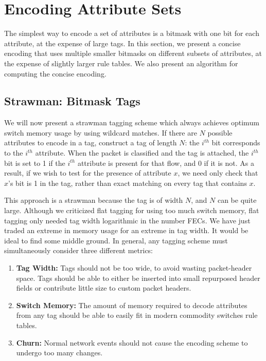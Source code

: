\section{Encoding Attribute Sets}
\label{sec:flextag_encoding} 
The simplest way to encode a set of attributes is a bitmask with one
bit for each attribute, at the expense of large tags.  In this
section, we present a concise encoding that uses multiple smaller
bitmasks on different subsets of attributes, at the expense of
slightly larger rule tables.  We also present an algorithm for
computing the concise encoding.

\subsection{Strawman: Bitmask Tags}

We will now present a strawman tagging scheme which always achieves optimum switch memory usage by using wildcard matches.
If there are $N$ possible attributes to encode in a tag, construct a tag of length $N$: 
the $i^{th}$ bit corresponds to the $i^{th}$ attribute. When the packet is classified
and the tag is attached, the $i^{th}$ bit is set to 1 if the $i^{th}$ attribute
is present for that flow, and 0 if it is not. As a result, if we wish to test for
the presence of attribute $x$, we need only check that $x$'s bit is 1 in the
tag, rather than exact matching on every tag that contains
$x$.

This approach is a strawman because the tag is of width $N$, and $N$ can be quite large.
Although we criticized flat tagging for using too much switch memory, 
flat tagging only needed tag width logarithmic in the number FECs. We have just traded an extreme in memory
usage for an extreme in tag width. It would be ideal to find some middle ground.
In general, any tagging scheme must simultaneously consider three different metrics:

\begin{enumerate}
\item \textbf{Tag Width:} Tags should not be too wide, to avoid wasting packet-header space.
Tags should be able to either be inserted into small repurposed header fields or contribute little size to custom packet headers. 
\item \textbf{Switch Memory:} The amount of memory required to decode attributes from any tag should be able to easily fit in modern commodity switches rule tables.
\item \textbf{Churn:} Normal network events should not cause the encoding scheme to undergo too many changes.
\end{enumerate}


